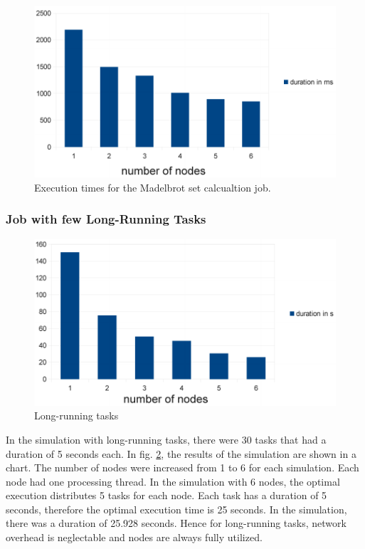\documentclass[12pt]{article}
\begin{document}
\begin{figure}[h]
\centering
\includegraphics[scale=0.7]{images/amazon-duration.pdf}
\caption{Execution times for the Madelbrot set calcualtion job.}
\label{fig:times-mandelbrot}
\end{figure}

\subsubsection{Job with few Long-Running Tasks}

\begin{figure}[hptb]
\centering
\includegraphics[scale=0.7]{images/long-running-duration.pdf}
\caption{Long-running tasks}
\label{fig:evaluation-long-running}
\end{figure}

In the simulation with long-running tasks, there were 30 tasks that had a duration of 5 seconds each. In fig. \ref{fig:evaluation-long-running}, the results of the simulation are shown in a chart. The number of nodes were increased from 1 to 6 for each simulation. Each node had one processing thread. In the simulation with 6 nodes, the optimal execution distributes 5 tasks for each node. Each task has a duration of 5 seconds, therefore the optimal execution time is 25 seconds. In the simulation, there was a duration of 25.928 seconds. Hence for long-running tasks, network overhead is neglectable and nodes are always fully utilized.
\end{document}
